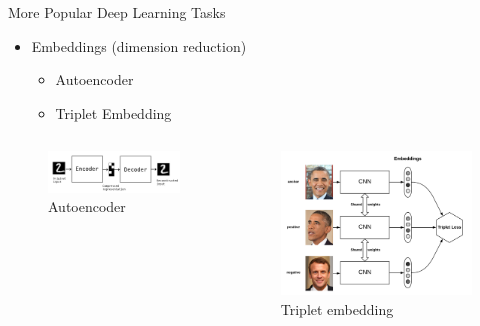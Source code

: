 \documentclass{beamer}
\begin{document}
\begin{frame}{More Popular Deep Learning Tasks}
        \begin{itemize}
            \item Embeddings (dimension reduction)
            \begin{itemize}
                \item Autoencoder
                \item Triplet Embedding
            \end{itemize}
        \end{itemize}
        
        \begin{columns}
                \begin{figure}
                    \includegraphics[width=\columnwidth]{autoencoder}
                    \caption*{Autoencoder}
                \end{figure}
                \begin{figure}
                    \includegraphics[width=\columnwidth]{triplet_embedding}
                    \caption*{Triplet embedding}
                \end{figure}
        \end{columns}
\end{frame}
\end{document}
